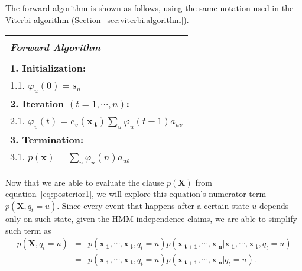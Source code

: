 The forward algorithm is shown as follows, using the same notation used in the Viterbi algorithm (Section~\ref{sec:viterbi.algorithm}).

\begin{center}
  \begin{spacing}{1.0}
    \begin{tabular}{l}
      \hline \\[-0.25cm]
      \hspace{1.3cm} {\large {\bf \emph{ Forward Algorithm } } } \hspace{1.3cm} \\[0.1cm]
      \hline \\[-0.25cm]
      \hspace{0.2cm} {\bf 1. Initialization:} \\
      \hspace{0.9cm} 1.1. $ \varphi_u(0) = s_u $ \\
      \hspace{0.2cm} {\bf 2. Iteration $ (t = 1, \cdots, n) $:} \\
      \hspace{0.9cm} 2.1. $ \varphi_v(t) = e_v(\mathbf{{x}_{\cdot t}}) \sum_{u}{\varphi_u(t-1) a_{uv}} $ \\
      \hspace{0.2cm} {\bf 3. Termination:} \\
      \hspace{0.9cm} 3.1. $ p(\mathbf{x}) = \sum_{u}{\varphi_u(n) a_{u\varepsilon}} $ \\[0.1cm]
      \hline
    \end{tabular}
  \end{spacing}
\end{center}

Now that we are able to evaluate the clause $ p(\mathbf{X}) $ from equation~\ref{eq:posterior1}, we will explore this equation's numerator term $ p(\mathbf{X}, q_t = u) $. Since every event that happens after a certain state $ u $ depends only on such state, given the HMM independence claims, we are able to simplify such term as
\begin{equation}
  \label{eq:posterior5}
  \begin{array}{lcl} 
    p(\mathbf{X}, q_t = u) & = & p(\mathbf{{x}_{\cdot 1}}, \cdots, \mathbf{{x}_{\cdot t}}, q_t = u) p(\mathbf{{x}_{\cdot t+1}}, \cdots, \mathbf{{x}_{\cdot n}} | \mathbf{{x}_{\cdot 1}}, \cdots, \mathbf{{x}_{\cdot t}}, q_t = u) \\ 
                    & = & p(\mathbf{{x}_{\cdot 1}}, \cdots, \mathbf{{x}_{\cdot t}}, q_t = u) p(\mathbf{{x}_{\cdot t+1}}, \cdots, \mathbf{{x}_{\cdot n}} | q_t = u).
  \end{array}
\end{equation}

